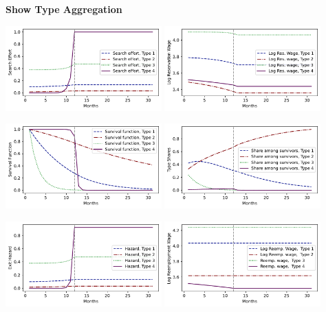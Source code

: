 \documentclass[letter, 10pt]{article}
\begin{document}
\pagebreak 
 \textbf{Show Type Aggregation} 
 
\includegraphics[clip=true,trim=0cm 0cm 0cm 0cm,width = 0.45\textwidth]{figures_Est1_compiled/fig_type_agg_s.pdf} 
\includegraphics[clip=true,trim=0cm 0cm 0cm 0cm,width = 0.45\textwidth]{figures_Est1_compiled/fig_type_agg_phi.pdf} 

 

 
\includegraphics[clip=true,trim=0cm 0cm 0cm 0cm,width = 0.45\textwidth]{figures_Est1_compiled/fig_type_agg_surv.pdf} 
\includegraphics[clip=true,trim=0cm 0cm 0cm 0cm,width = 0.45\textwidth]{figures_Est1_compiled/fig_type_agg_share.pdf} 
 

 
\includegraphics[clip=true,trim=0cm 0cm 0cm 0cm,width = 0.45\textwidth]{figures_Est1_compiled/fig_type_agg_hazard.pdf} 
\includegraphics[clip=true,trim=0cm 0cm 0cm 0cm,width = 0.45\textwidth]{figures_Est1_compiled/fig_type_agg_w.pdf} 
\end{document}

